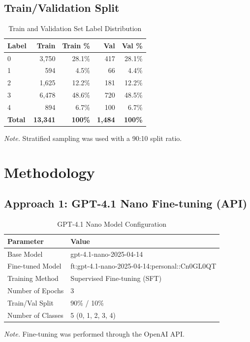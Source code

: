 \documentclass[11pt, a4paper]{article}
\begin{document}
\subsection{Train/Validation Split}

\begin{table}[H]
\centering
\caption{Train and Validation Set Label Distribution}
\label{tab:train_val_split}
\begin{tabular}{lrrrr}
\toprule
\textbf{Label} & \textbf{Train} & \textbf{Train \%} & \textbf{Val} & \textbf{Val \%} \\
\midrule
0 & 3,750 & 28.1\% & 417 & 28.1\% \\
1 & 594 & 4.5\% & 66 & 4.4\% \\
2 & 1,625 & 12.2\% & 181 & 12.2\% \\
3 & 6,478 & 48.6\% & 720 & 48.5\% \\
4 & 894 & 6.7\% & 100 & 6.7\% \\
\midrule
\textbf{Total} & \textbf{13,341} & \textbf{100\%} & \textbf{1,484} & \textbf{100\%} \\
\bottomrule
\end{tabular}

\vspace{0.5em}
\footnotesize\textit{Note.} Stratified sampling was used with a 90:10 split ratio.
\end{table}

\section{Methodology}

\subsection{Approach 1: GPT-4.1 Nano Fine-tuning (API)}

\begin{table}[H]
\centering
\caption{GPT-4.1 Nano Model Configuration}
\label{tab:gpt_config}
\begin{tabular}{ll}
\toprule
\textbf{Parameter} & \textbf{Value} \\
\midrule
Base Model & gpt-4.1-nano-2025-04-14 \\
Fine-tuned Model & ft:gpt-4.1-nano-2025-04-14:personal::Cn0GL0QT \\
Training Method & Supervised Fine-tuning (SFT) \\
Number of Epochs & 3 \\
Train/Val Split & 90\% / 10\% \\
Number of Classes & 5 (0, 1, 2, 3, 4) \\
\bottomrule
\end{tabular}

\vspace{0.5em}
\footnotesize\textit{Note.} Fine-tuning was performed through the OpenAI API.
\end{table}
\end{document}
